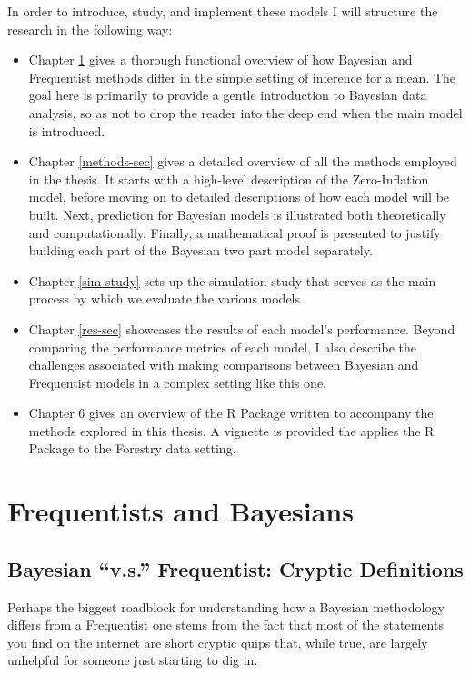 \documentclass[12pt,twoside]{reedthesis}
\begin{document}
In order to introduce, study, and implement these models I will structure the research in the following way:
\begin{itemize}
\item
  Chapter \ref{bayes-freq} gives a thorough functional overview of how Bayesian and Frequentist methods differ in the simple setting of inference for a mean. The goal here is primarily to provide a gentle introduction to Bayesian data analysis, so as not to drop the reader into the deep end when the main model is introduced.
\item
  Chapter \ref{methods-sec} gives a detailed overview of all the methods employed in the thesis. It starts with a high-level description of the Zero-Inflation model, before moving on to detailed descriptions of how each model will be built. Next, prediction for Bayesian models is illustrated both theoretically and computationally. Finally, a mathematical proof is presented to justify building each part of the Bayesian two part model separately.
\item
  Chapter \ref{sim-study} sets up the simulation study that serves as the main process by which we evaluate the various models.
\item
  Chapter \ref{res-sec} showcases the results of each model's performance. Beyond comparing the performance metrics of each model, I also describe the challenges associated with making comparisons between Bayesian and Frequentist models in a complex setting like this one.
\item
  Chapter 6 gives an overview of the R Package written to accompany the methods explored in this thesis. A vignette is provided the applies the R Package to the Forestry data setting.
\end{itemize}
\hypertarget{bayes-freq}{%
\chapter{Frequentists and Bayesians}\label{bayes-freq}}

\hypertarget{bayesian-v.s.-frequentist-cryptic-definitions}{%
\section{Bayesian ``v.s.'' Frequentist: Cryptic Definitions}\label{bayesian-v.s.-frequentist-cryptic-definitions}}

Perhaps the biggest roadblock for understanding how a Bayesian methodology differs from a Frequentist one stems from the fact that most of the statements you find on the internet are short cryptic quips that, while true, are largely unhelpful for someone just starting to dig in.
\end{document}
